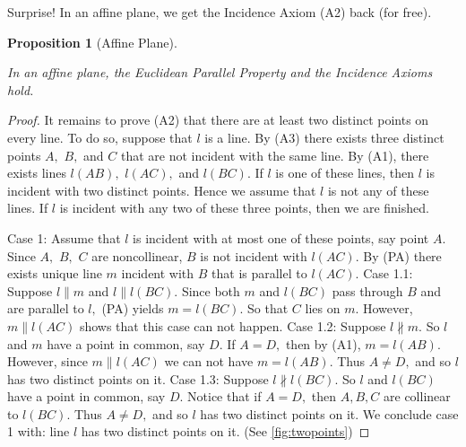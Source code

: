 \documentclass[
  twoside,
  12pt,
  letterpaper,
  fleqn]{article}
\theoremstyle{definition}
\theoremstyle{definition}
\theoremstyle{plain}
\newtheorem{proposition}{Proposition}[section]
\theoremstyle{plain}
\theoremstyle{remark}
\begin{document}
Surprise! In an affine plane, we get the Incidence Axiom (A2) back (for
free).

\begin{proposition}[Affine
Plane]\protect\hypertarget{prp-twodispointaff}{}\label{prp-twodispointaff}

In an affine plane, the Euclidean Parallel Property and the Incidence
Axioms hold.

\end{proposition}

\begin{proof}

It remains to prove (A2) that there are at least two distinct points on
every line. To do so, suppose that \(l\) is a line. By (A3) there exists
three distinct points \(A,\) \(B,\) and \(C\) that are not incident with
the same line. By (A1), there exists lines \(l(AB),\) \(l(AC),\) and
\(l(BC).\) If \(l\) is one of these lines, then \(l\) is incident with
two distinct points. Hence we assume that \(l\) is not any of these
lines. If \(l\) is incident with any two of these three points, then we
are finished.

Case 1: Assume that \(l\) is incident with at most one of these points,
say point \(A.\) Since \(A,\) \(B,\) \(C\) are noncollinear, \(B\) is
not incident with \(l(AC).\) By (PA) there exists unique line \(m\)
incident with \(B\) that is parallel to \(l(AC).\) Case 1.1: Suppose
\(l \parallel m\) and \(l \parallel l(BC).\) Since both \(m\) and
\(l(BC)\) pass through \(B\) and are parallel to \(l,\) (PA) yields
\(m=l(BC).\) So that \(C\) lies on \(m.\) However, \(m \parallel l(AC)\)
shows that this case can not happen. Case 1.2: Suppose
\(l\not\parallel m.\) So \(l\) and \(m\) have a point in common, say
\(D.\) If \(A=D,\) then by (A1), \(m=l(AB).\) However, since
\(m \parallel l(AC)\) we can not have \(m=l(AB).\) Thus \(A\neq D,\) and
so \(l\) has two distinct points on it. Case 1.3: Suppose
\(l\not\parallel l(BC).\) So \(l\) and \(l(BC)\) have a point in common,
say \(D.\) Notice that if \(A=D,\) then \(A, B, C\) are collinear to
\(l(BC).\) Thus \(A\neq D,\) and so \(l\) has two distinct points on it.
We conclude case 1 with: line \(l\) has two distinct points on it. (See
\eqref{fig:twopoints})


\end{proof}
\end{document}
